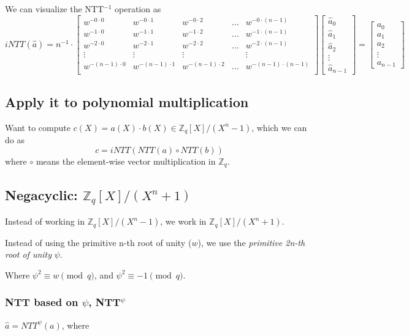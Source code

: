 \documentclass{article}
\newcommand{\Zq}{\mathbb{Z}_q}
\newcommand{\Rq}{\mathbb{Z}_q[X]/(X^n+1)}
\begin{document}
We can visualize the NTT$^{-1}$ operation as
$$
iNTT(\hat{a}) =
n^{-1} \cdot
\begin{bmatrix}
w^{-0 \cdot 0} & w^{-0 \cdot 1} & w^{-0 \cdot 2} & \ldots & w^{-0 \cdot (n-1)} \\
w^{-1 \cdot 0} & w^{-1 \cdot 1} & w^{-1 \cdot 2} & \ldots & w^{-1 \cdot (n-1)} \\
w^{-2 \cdot 0} & w^{-2 \cdot 1} & w^{-2 \cdot 2} & \ldots & w^{-2 \cdot (n-1)} \\
\vdots & \vdots & \vdots & & \vdots\\
w^{-(n-1) \cdot 0} & w^{-(n-1) \cdot 1} & w^{-(n-1) \cdot 2} & \ldots & w^{-(n-1) \cdot (n-1)} \\
\end{bmatrix}
\begin{bmatrix}
\hat{a}_0 \\ \hat{a}_1 \\ \hat{a}_2 \\ \vdots \\ \hat{a}_{n-1}
\end{bmatrix}
=
\begin{bmatrix}
a_0 \\ a_1 \\ a_2 \\ \vdots \\ a_{n-1}
\end{bmatrix}
$$

\subsection{Apply it to polynomial multiplication}
Want to compute $c(X) = a(X) \cdot b(X) \in \mathbb{Z}_q[X] / (X^n-1)$, which we
can do as
$$c= iNTT(NTT(a) \circ NTT(b))$$
where $\circ$ means the element-wise vector multiplication in $\Zq$.



\subsection{Negacyclic: \texorpdfstring{$\mathbb{Z}_q[X] / (X^n+1)$}{Zq[X]/(X**n+1)}}
Instead of working in $\mathbb{Z}_q[X] / (X^n-1)$, we work in $\Rq$.

Instead of using the primitive n-th root of unity ($w$), we use the
\emph{primitive 2n-th root of unity} $\psi$.

Where $\psi^2 \equiv w \pmod q$, and $\psi^2 \equiv -1 \pmod q$.


\subsubsection{NTT based on \texorpdfstring{$\psi$}{psi}, NTT\texorpdfstring{$^\psi$}{$**psi$}}
$\hat{a} = NTT^{\psi}(a)$, where
\end{document}
